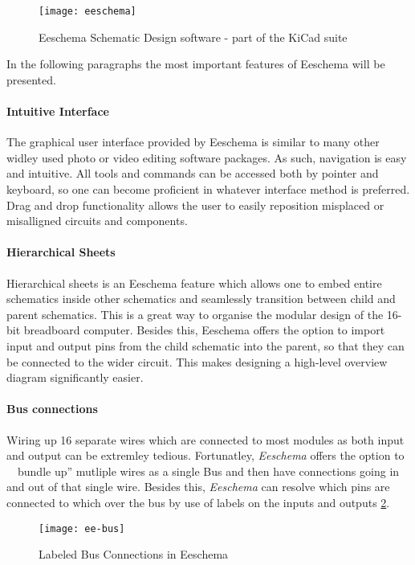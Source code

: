 \begin{figure}[h]
  \centering
  \texttt{[image: eeschema]}
  \caption{Eeschema Schematic Design software - part of the KiCad suite}
  \label{eeschema-interface}
\end{figure}
\clearpage

In the following paragraphs the most important features of Eeschema will be presented.

\paragraph{Intuitive Interface}
The graphical user interface provided by Eeschema is similar to many other widley used photo or video editing software packages.
As such, navigation is easy and intuitive. All tools and commands can be accessed both by pointer and keyboard, so one can become
proficient in whatever interface method is preferred. Drag and drop functionality allows the user to easily reposition misplaced
or misalligned circuits and components.

\paragraph{Hierarchical Sheets}
Hierarchical sheets is an Eeschema feature which allows one to embed entire schematics inside other schematics and seamlessly
transition between child and parent schematics. This is a great way to organise the modular design of the 16-bit breadboard
computer. Besides this, Eeschema offers the option to import input and output pins from the child schematic into the parent,
so that they can be connected to the wider circuit. This makes designing a high-level overview diagram significantly easier.

\paragraph{Bus connections}
Wiring up 16 separate wires which are connected to most modules as both input and output can be extremley tedious. Fortunatley,
\emph{Eeschema} offers the option to ~~bundle up'' mutliple wires as a single Bus and then have connections going in and out
of that single wire. Besides this, \emph{Eeschema} can resolve which pins are connected to which over the bus by use of labels
on the inputs and outputs \ref{ee-bus}.

\begin{figure}[h]
  \centering
  \texttt{[image: ee-bus]}
  \caption{Labeled Bus Connections in Eeschema}
  \label{ee-bus}
\end{figure}

